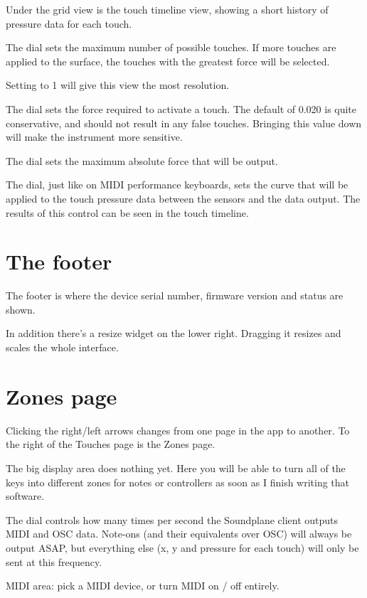 Under the grid view is the touch timeline view, showing a short history of pressure data for each touch.  

The   dial sets the maximum number of possible touches.  If more touches are applied to the surface, the touches with the greatest force will be selected. 

Setting   to 1 will give this view the most resolution.

The  dial sets the force required to activate a touch.  The default of 0.020 is quite conservative, and should not result in any false touches.  Bringing this value down will make the instrument more sensitive.

The  dial sets the maximum absolute force that will be output.  

The  dial, just like on MIDI performance keyboards, sets the curve that will be applied to the touch pressure data between the sensors and the data output.  The results of this control can be seen in the touch timeline. 

\section{The footer}

The footer is where the device serial number, firmware version and status are shown. 

In addition there's a resize widget on the lower right.  Dragging it resizes and scales the whole interface.  

\section{Zones page}

Clicking the right/left arrows changes from one page in the app to another.  To the right of the Touches page is the Zones page.  

The big display area does nothing yet. Here you will be able to turn all of the keys into different zones for notes or controllers as soon as I finish writing that software. 

The  dial controls how many times per second the Soundplane client outputs MIDI and OSC data.  Note-ons (and their equivalents over OSC) will always be output ASAP, but everything else (x, y and pressure for each touch) will only be sent at this frequency. 

MIDI area: pick a MIDI device, or turn MIDI on / off entirely.

